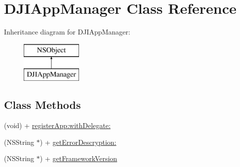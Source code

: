 \hypertarget{interface_d_j_i_app_manager}{\section{D\+J\+I\+App\+Manager Class Reference}
\label{interface_d_j_i_app_manager}
}
Inheritance diagram for D\+J\+I\+App\+Manager\+:\begin{figure}[H]
\begin{center}
\leavevmode
\includegraphics[height=2.000000cm]{interface_d_j_i_app_manager}
\end{center}
\end{figure}
\subsection*{Class Methods}
\begin{DoxyCompactItemize}
\item 
(void) + \hyperlink{interface_d_j_i_app_manager_a5fc2b9ae612f559639f631c7b1dfbf4e}{register\+App\+:with\+Delegate\+:}
\item 
(N\+S\+String $\ast$) + \hyperlink{interface_d_j_i_app_manager_adb0281179205bdd28ecb93dc5a0c482d}{get\+Error\+Descryption\+:}
\item 
(N\+S\+String $\ast$) + \hyperlink{interface_d_j_i_app_manager_af0ca386a7a26797da7c4806b016850b6}{get\+Framework\+Version}
\end{DoxyCompactItemize}


